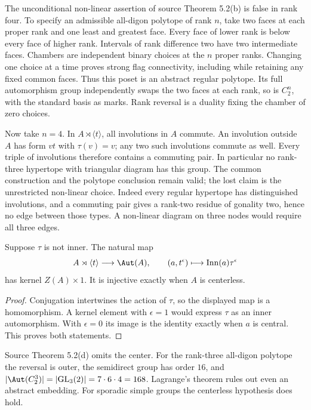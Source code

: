 The unconditional non-linear assertion of source Theorem 5.2(b) is false
in rank four. To specify an admissible all-digon polytope of rank $n$,
take two faces at each proper rank and one least and greatest face.
Every face of lower rank is below every face of higher rank. Intervals
of rank difference two have two intermediate faces. Chambers are
independent binary choices at the $n$ proper ranks. Changing one choice
at a time proves strong flag connectivity, including while retaining
any fixed common faces. Thus this poset is an abstract regular polytope.
Its full automorphism group independently swaps the two faces at each
rank, so is $C_2^n$, with the standard basis as marks. Rank reversal
is a duality fixing the chamber of zero choices.

Now take $n=4$. In $A\rtimes\langle t\rangle$, all
involutions in $A$ commute. An involution outside $A$ has form $v t$
with $\tau(v)=v$; any two such involutions commute as well. Every
triple of involutions therefore contains a commuting pair. In particular
no rank-three hypertope with triangular diagram has this group. The
common construction and the polytope conclusion remain valid; the lost
claim is the unrestricted non-linear choice. Indeed every regular
hypertope has distinguished involutions, and a commuting pair gives a
rank-two residue of gonality two, hence no edge between those types.
A non-linear diagram on three nodes would require all three edges.

\begin{lemma}\label{lem:automorphism-map}
Suppose $\tau$ is not inner. The natural map
\[
 A\rtimes\langle t\rangle\longrightarrow\Aut(A),\qquad
 (a,t^\epsilon)\longmapsto\operatorname{Inn}(a)\tau^\epsilon
\]
has kernel $Z(A)\times1$. It is injective exactly when $A$ is centerless.
\end{lemma}
\begin{proof}
Conjugation intertwines the action of $\tau$, so the displayed map is
a homomorphism. A kernel element with $\epsilon=1$ would express
$\tau$ as an inner automorphism. With $\epsilon=0$ its image is the
identity exactly when $a$ is central. This proves both statements.
\end{proof}
Source Theorem 5.2(d) omits the center. For the rank-three all-digon
polytope the reversal is outer, the semidirect group has order $16$, and
$|\Aut(C_2^3)|=|\mathrm{GL}_3(2)|=7\cdot6\cdot4=168$.
Lagrange's theorem rules out even an abstract embedding. For sporadic
simple groups the centerless hypothesis does hold.

